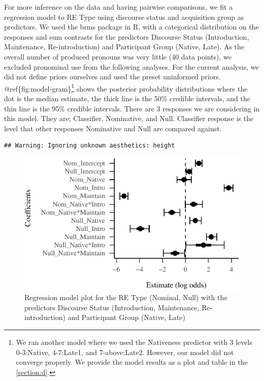 \documentclass[review]{elsarticle} %
\begin{document}
For more inference on the data and having pairwise comparisons, we fit a
regression model to RE Type using discourse status and acquisition group
as predictors. We used the brms package \citep{burkner2018} in R, with a
categorical distribution on the responses and sum contrasts for the
predictors Discourse Status (Introduction, Maintenance, Re-introduction)
and Participant Group (Native, Late). As the overall number of produced
pronouns was very little (40 data points), we excluded pronominal use
from the following analyses. For the current analysis, we did not define
priors ourselves and used the preset uninformed priors.
@ref\{fig:model-gram\}\footnote{We ran another model where we used the
  Nativeness predictor with 3 levels 0-3:Native, 4-7:Late1, and
  7-above:Late2. However, our model did not converge properly. We
  provide the model results as a plot and table in the \ref{section:d}.}
shows the posterior probability distributions where the dot is the
median estimate, the thick line is the 50\% credible intervals, and the
thin line is the 95\% credible intervals. There are 3 responses we are
considering in this model. They are; Classifier, Nominative, and Null.
Classifier response is the level that other responses Nominative and
Null are compared against.

\begin{verbatim}
## Warning: Ignoring unknown aesthetics: height
\end{verbatim}

\begin{figure}
\centering
\includegraphics{manuscript_v2_files/figure-latex/model-gram-1.pdf}
\caption{Regression model plot for the RE Type (Nominal, Null) with the
predictors Discourse Status (Introduction, Maintenance, Re-introduction)
and Participant Group (Native, Late)}
\end{figure}
\end{document}
